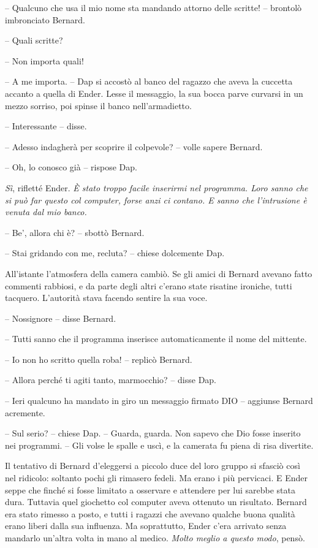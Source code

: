 {-- Qualcuno che usa il mio nome sta mandando attorno delle scritte! --
	brontolò imbronciato Bernard.}

{-- Quali scritte?}

{-- Non importa quali!}

{-- A me importa. -- Dap si accostò al banco del ragazzo che aveva la
	cuccetta accanto a quella di Ender. Lesse il messaggio, la sua bocca
	parve curvarsi in un mezzo sorriso, poi spinse il banco
	nell'armadietto.}

{-- Interessante -- disse.}

{-- Adesso indagherà per scoprire il colpevole? -- volle sapere
	Bernard.}

{-- Oh, lo conosco già -- rispose Dap.}

\emph{{Sì}}{, \emph{} rifletté Ender. \emph{È stato troppo facile
		inserirmi nel programma. Loro sanno che si può far questo col computer,
		forse anzi ci contano. E sanno che l'intrusione è venuta dal mio
		banco.}}

{-- Be', allora chi è? -- sbottò Bernard.}

{-- Stai gridando con me, recluta? -- chiese dolcemente Dap.}

{All'istante l'atmosfera della camera cambiò. Se gli amici di Bernard
	avevano fatto commenti rabbiosi, e da parte degli altri c'erano state
	risatine ironiche, tutti tacquero. L'autorità stava facendo sentire la
	sua voce.}

{-- Nossignore -- disse Bernard.}

{-- Tutti sanno che il programma inserisce automaticamente il nome del
	mittente.}

{-- Io non ho scritto quella roba! -- replicò Bernard.}

{-- Allora perché ti agiti tanto, marmocchio? -- disse Dap.}

{-- Ieri qualcuno ha mandato in giro un messaggio firmato DIO --
	aggiunse Bernard acremente.}

{-- Sul serio? -- chiese Dap. -- Guarda, guarda. Non sapevo che Dio
	fosse inserito nei programmi. -- Gli volse le spalle e uscì, e la
	camerata fu piena di risa divertite.}

{Il tentativo di Bernard d'eleggersi a piccolo duce del loro gruppo si
	sfasciò così nel ridicolo: soltanto pochi gli rimasero fedeli. Ma erano
	i più pervicaci. E Ender seppe che finché si fosse limitato a osservare
	e attendere per lui sarebbe stata dura. Tuttavia quel giochetto col
	computer aveva ottenuto un risultato. Bernard era stato rimesso a posto,
	e tutti i ragazzi che avevano qualche buona qualità erano liberi dalla
	sua influenza. Ma soprattutto, Ender c'era arrivato senza mandarlo
	un'altra volta in mano al medico. \emph{Molto meglio a questo modo},
	\emph{} pensò.}

